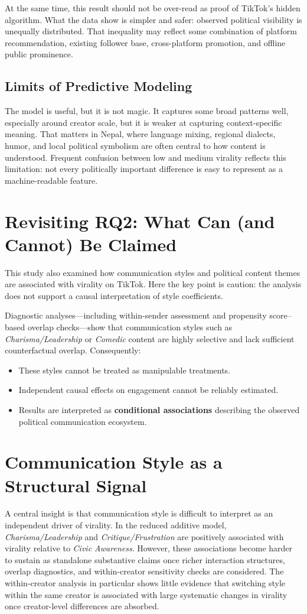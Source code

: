 \documentclass[12pt,a4paper]{report}
\begin{document}
At the same time, this result should not be over-read as proof of TikTok’s hidden algorithm. What the data show is simpler and safer: observed political visibility is unequally distributed. That inequality may reflect some combination of platform recommendation, existing follower base, cross-platform promotion, and offline public prominence.

\subsection{Limits of Predictive Modeling}
The model is useful, but it is not magic. It captures some broad patterns well, especially around creator scale, but it is weaker at capturing context-specific meaning. That matters in Nepal, where language mixing, regional dialects, humor, and local political symbolism are often central to how content is understood. Frequent confusion between low and medium virality reflects this limitation: not every politically important difference is easy to represent as a machine-readable feature.
\newpage

\section{Revisiting RQ2: What Can (and Cannot) Be Claimed}
This study also examined how communication styles and political content themes are associated with virality on TikTok. Here the key point is caution: the analysis does not support a causal interpretation of style coefficients. 

Diagnostic analyses—including within-sender assessment and propensity score–based overlap checks—show that communication styles such as \textit{Charisma/Leadership} or \textit{Comedic} content are highly selective and lack sufficient counterfactual overlap. Consequently:
\begin{itemize}
    \item These styles cannot be treated as manipulable treatments.
    \item Independent causal effects on engagement cannot be reliably estimated.
    \item Results are interpreted as \textbf{conditional associations} describing the observed political communication ecosystem.
\end{itemize}

\section{Communication Style as a Structural Signal}
A central insight is that communication style is difficult to interpret as an independent driver of virality. In the reduced additive model, \textit{Charisma/Leadership} and \textit{Critique/Frustration} are positively associated with virality relative to \textit{Civic Awareness}. However, these associations become harder to sustain as standalone substantive claims once richer interaction structures, overlap diagnostics, and within-creator sensitivity checks are considered. The within-creator analysis in particular shows little evidence that switching style within the same creator is associated with large systematic changes in virality once creator-level differences are absorbed.
\end{document}
